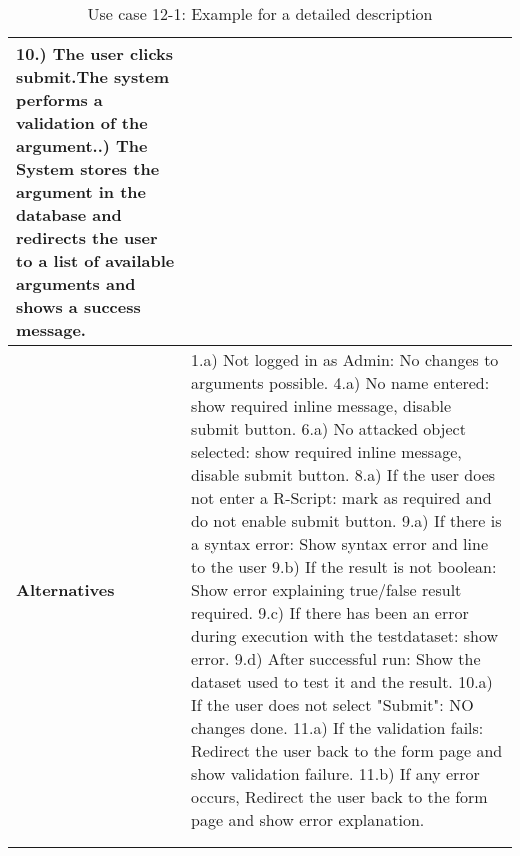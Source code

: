 {\begin{longtable}{|p{2cm} p{11cm}|}
				10.) The user clicks submit.The system performs a validation of the argument.\newline
				11.) The System stores the argument in the database and redirects the user to a list of available arguments and shows a success message.
		\\
		\hline
			\textbf{Alternatives} & 
							1.a) Not logged in as Admin: No changes to arguments possible.
				\newline	4.a) No name entered: show required inline message, disable submit button.
				\newline	6.a) No attacked object selected: show required inline message, disable submit button.
				\newline	8.a) If the user does not enter a R-Script: mark as required and do not enable submit button.
				\newline	9.a) If there is a syntax error: Show syntax error and line to the user
				\newline	9.b) If the result is not boolean: Show error explaining true/false result required.
				\newline	9.c) If there has been an error during execution with the testdataset: show error.
				\newline	9.d) After successful run: Show the dataset used to test it and the result.
				\newline	10.a) If the user does not select "Submit": NO changes done.
				\newline	11.a) If the validation fails: Redirect the user back to the form page and show validation failure.
				\newline	11.b) If any error occurs,  Redirect the user back to the form page and show error explanation.
							\\
		\hline
				\label{uc:12-1}\\
	\caption{Use case 12-1: Example for a detailed description}
	\end{longtable}
}